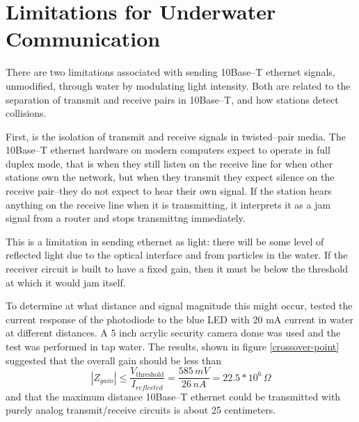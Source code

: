 \documentclass{article}
\begin{document}
\section{Limitations for Underwater Communication}

There are two limitations associated with sending 10Base--T ethernet signals,
unmodified, through water by modulating light intensity.
Both are related to the separation of transmit and receive pairs
in 10Base--T, and how stations detect collisions.

First, is the isolation of transmit and receive signals in twisted--pair media.
The 10Base--T ethernet hardware on modern computers expect to operate in full
duplex mode, that is when they still listen on the receive line for when
other stations own the network, but when they transmit they expect silence
on the receive pair--they do not expect to hear their own signal.
If the station hears anything on the receive line when it is transmitting,
it interprets it as a jam signal from a router and stops transmittng immediately.

This is a limitation in sending ethernet as light: there will be some
level of reflected light due to the optical interface and from particles in the water.
If the receiver circuit is built to have a fixed gain, then it must be below
the threshold at which it would jam itself.

To determine at what distance and signal magnitude this might occur,
tested the current response of the photodiode to the blue LED with 20 mA current
in water at different distances.
A 5 inch acrylic security camera dome was used and the test was performed in
tap water.
The results, shown in figure \ref{crossover-point} suggested that the overall gain
should be less than
\begin{equation}
|Z_{gain}| \leq \frac{V_{\textrm{threshold}}}{I_{reflected}}=\frac{585\,mV}{26\,nA}=22.5*10^{6}\,\Omega
\end{equation}
and that the maximum distance 10Base--T ethernet could be transmitted with purely analog transmit/receive
circuits is about 25 centimeters.
\end{document}
